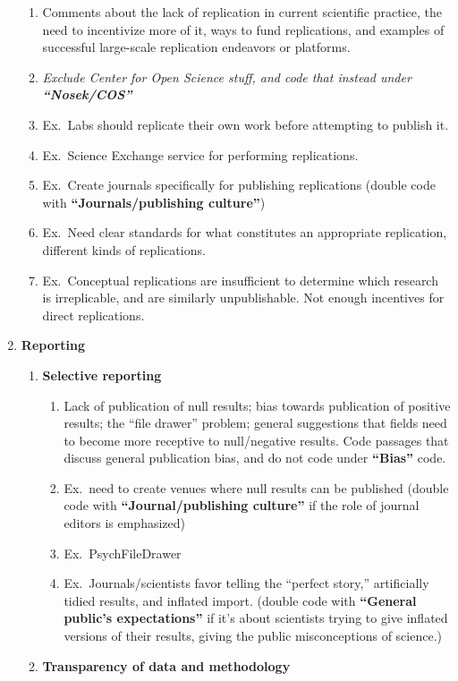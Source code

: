 \documentclass[
]{scrartcl}
\begin{document}
\begin{enumerate}
  \begin{enumerate}

  \item
    Comments about the lack of replication in current scientific
    practice, the need to incentivize more of it, ways to fund
    replications, and examples of successful large-scale replication
    endeavors or platforms.
  \item
    \emph{Exclude Center for Open Science stuff, and code that instead
    under \textbf{``Nosek/COS''} }
  \item
    Ex.~Labs should replicate their own work before attempting to
    publish it.
  \item
    Ex.~Science Exchange service for performing replications.
  \item
    Ex.~Create journals specifically for publishing replications (double
    code with \textbf{``Journals/publishing culture''})
  \item
    Ex.~Need clear standards for what constitutes an appropriate
    replication, different kinds of replications.
  \item
    Ex.~Conceptual replications are insufficient to determine which
    research is irreplicable, and are similarly unpublishable. Not
    enough incentives for direct replications.
  \end{enumerate}
\item
  \textbf{Reporting}

  \begin{enumerate}

  \item
    \textbf{Selective reporting}

    \begin{enumerate}
    
    \item
      Lack of publication of null results; bias towards publication of
      positive results; the ``file drawer'' problem; general suggestions
      that fields need to become more receptive to null/negative
      results. Code passages that discuss general publication bias, and
      do not code under \textbf{``Bias''} code.
    \item
      Ex.~need to create venues where null results can be published
      (double code with \textbf{``Journal/publishing culture''} if the
      role of journal editors is emphasized)
    \item
      Ex.~PsychFileDrawer
    \item
      Ex.~Journals/scientists favor telling the ``perfect story,''
      artificially tidied results, and inflated import. (double code
      with \textbf{``General public's expectations''} if it's about
      scientists trying to give inflated versions of their results,
      giving the public misconceptions of science.)
    \end{enumerate}
  \item
    \textbf{Transparency of data and methodology}


\end{enumerate}
\end{enumerate}
\end{document}

